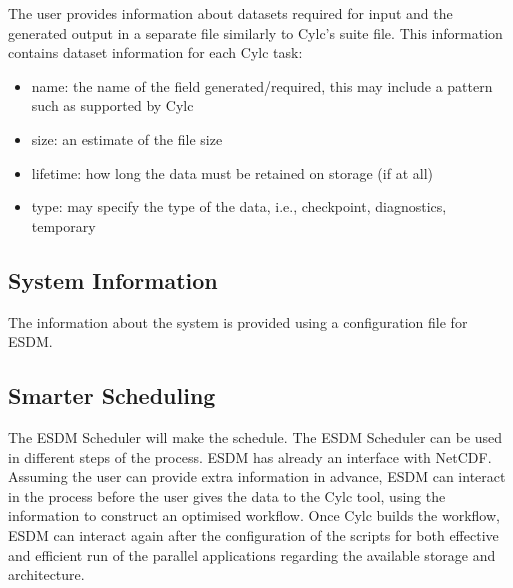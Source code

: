 \documentclass[a4paper]{article}
\begin{document}
The user provides information about datasets required for input and the generated output in a separate file similarly to Cylc's suite file.
This information contains dataset information for each Cylc task:
\begin{itemize}
  \item name: the name of the field generated/required, this may include a pattern such as supported by Cylc
  \item size: an estimate of the file size
  \item lifetime: how long the data must be retained on storage (if at all)
  \item type: may specify the type of the data, i.e., checkpoint, diagnostics, temporary
\end{itemize}



\subsection{System Information}

The information about the system is provided using a configuration file for ESDM.


\subsection{Smarter Scheduling}

The ESDM Scheduler will make the schedule. The ESDM Scheduler can be used in different steps of the process. ESDM has already an interface with NetCDF. Assuming the user can provide extra information in advance, ESDM can interact in the process before the user gives the data to the Cylc tool, using the information to construct an optimised workflow. Once Cylc builds the workflow, ESDM can interact again after the configuration of the scripts for both effective and efficient run of the parallel applications regarding the available storage and architecture.
\end{document}
